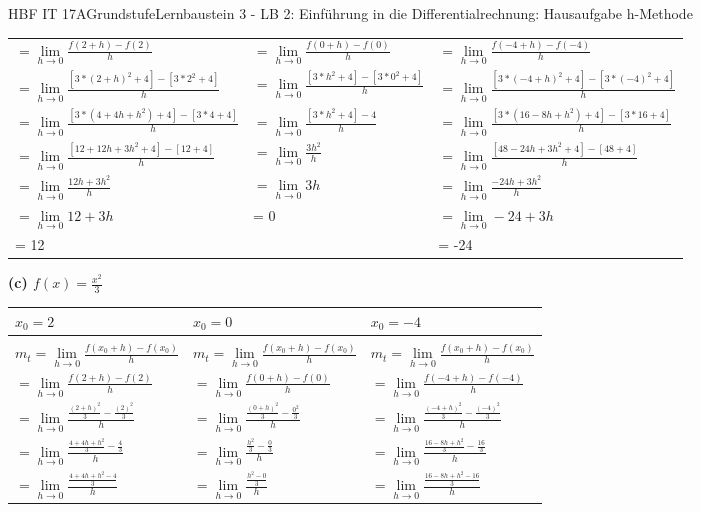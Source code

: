 \documentclass[oneside,openany,headings=optiontotoc,11pt,numbers=noenddot]{scrreprt}
\begin{document}
\begin{worksheet}{HBF IT 17A}{Grundstufe}{Lernbaustein 3 - LB 2: Einführung in die Differentialrechnung: Hausaufgabe h-Methode}
\begin{framed}
\begin{tabularx}{\textwidth}{X|X|X}
				\(=\lim\limits_{h \to 0} \frac{f(2+h)-f(2)}{h}\) & \(=\lim\limits_{h \to 0} \frac{f(0+h)-f(0)}{h}\) & \(=\lim\limits_{h \to 0} \frac{f(-4+h)-f(-4)}{h}\)\\
				\(=\lim\limits_{h \to 0} \frac{[3*(2+h)^2 + 4] - [3*2^2 + 4]}{h}\) & \(=\lim\limits_{h \to 0} \frac{[3*h^2 + 4] - [3*0^2+4]}{h}\) & \(=\lim\limits_{h \to 0} \frac{[3*(-4+h)^2 + 4] - [3*(-4)^2 + 4]}{h}\)\\
				\(=\lim\limits_{h \to 0} \frac{[3*(4 +4h+h^2) +4] -[3*4+4]}{h}\) & \(=\lim\limits_{h \to 0} \frac{[3*h^2 + 4] - 4}{h}\) & \(=\lim\limits_{h \to 0} \frac{[3*(16-8h+h^2)+4] -[3*16+4]}{h}\)\\
				\(=\lim\limits_{h \to 0}\frac{[12+12h+3h^2+4] -[12+4]}{h}\) & \(=\lim\limits_{h \to 0}\frac{3h^2}{h}\) & \(=\lim\limits_{h \to 0}\frac{[48-24h+3h^2+4] -[48+4]}{h}\)\\
				\(=\lim\limits_{h \to 0} \frac{12h +3h^2}{h}\) & \(=\lim\limits_{h \to 0} 3h\) & \(=\lim\limits_{h \to 0} \frac{-24h +3h^2}{h}\)\\
				\(=\lim\limits_{h \to 0} 12+3h\) & = 0 & \(=\lim\limits_{h \to 0} -24+3h\)\\
				= 12 & & = -24
			\end{tabularx}
			\textbf{(c) \(f(x) = \frac{x^2}{3}\)}\\			
			\begin{tabularx}{\textwidth}{X|X|X}
				\(x_0 = 2\) & \(x_0 = 0\) & \(x_0=-4\)\\
				\hline
				\\
				\(m_{t} = \lim\limits_{h \to 0} \frac{f(x_{0}+h) - f(x_0)}{h}\) & \(m_{t} = \lim\limits_{h \to 0} \frac{f(x_{0}+h) - f(x_0)}{h}\) & \(m_{t} = \lim\limits_{h \to 0} \frac{f(x_{0}+h) - f(x_0)}{h}\)\\
				\(=\lim\limits_{h \to 0} \frac{f(2+h)-f(2)}{h}\) & \(=\lim\limits_{h \to 0} \frac{f(0+h)-f(0)}{h}\) & \(=\lim\limits_{h \to 0} \frac{f(-4+h)-f(-4)}{h}\)\\
				\(=\lim\limits_{h \to 0} \frac{\frac{(2+h)^2}{3}-\frac{(2)^2}{3}}{h}\) & \(=\lim\limits_{h \to 0} \frac{\frac{(0+h)^2}{3}-\frac{0^2}{3}}{h}\) & \(=\lim\limits_{h \to 0} \frac{\frac{(-4+h)^2}{3}-\frac{(-4)^2}{3}}{h}\)\\
				\(=\lim\limits_{h \to 0}\frac{\frac{4+4h+h^2}{3}-\frac{4}{3}}{h}\) & \(=\lim\limits_{h \to 0}\frac{\frac{h^2}{3}-\frac{0}{3}}{h}\) & \(=\lim\limits_{h \to 0}\frac{\frac{16-8h+h^2}{3}-\frac{16}{3}}{h}\)\\
				\(=\lim\limits_{h \to 0}\frac{\frac{4+4h+h^2-4}{3}}{h}\) & \(=\lim\limits_{h \to 0}\frac{\frac{h^2-0}{3}}{h}\) & \(=\lim\limits_{h \to 0}\frac{\frac{16-8h+h^2-16}{3}}{h}\)\\

\end{tabularx}
\end{framed}
\end{worksheet}
\end{document}
